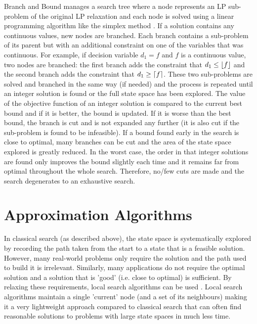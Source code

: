 Branch and Bound manages a search tree where a node represents an LP sub-problem of the original LP relaxation and each node is solved using a linear programming algorithm like the simplex method \citep{dantzig1949programming}. If a solution contains any continuous values, new nodes are branched. Each branch contains a sub-problem of its parent but with an additional constraint on one of the variables that was continuous. For example, if decision variable $d_1 = f$ and $f$ is a continuous value, two nodes are branched: the first branch adds the constraint that $d_1 \leq \floor*{f}$ and the second branch adds the constraint that $d_1 \geq \ceil*{f}$. These two sub-problems are solved and branched in the same way (if needed) and the process is repeated until an integer solution is found or the full state space has been explored. The value of the objective function of an integer solution is compared to the current best bound and if it is better, the bound is updated. If it is worse than the best bound, the branch is cut and is not expanded any further (it is also cut if the sub-problem is found to be infeasible). If a bound found early in the search is close to optimal, many branches can be cut and the area of the state space explored is greatly reduced. In the worst case, the order in that integer solutions are found only improves the bound slightly each time and it remains far from optimal throughout the whole search. Therefore, no/few cuts are made and the search degenerates to an exhaustive search.

\section{Approximation Algorithms}
In classical search (as described above), the state space is systematically explored by recording the path taken from the start to a state that is a feasible solution. However, many real-world problems only require the solution and the path used to build it is irrelevant. Similarly, many applications do not require the optimal solution and a solution that is 'good' (i.e. close to optimal) is sufficient. By relaxing these requirements, local search algorithms can be used \citep{russell2016artificial}. Local search algorithms maintain a single 'current' node (and a set of its neighbours) making it a very lightweight approach compared to classical search that can often find reasonable solutions to problems with large state spaces in much less time.

